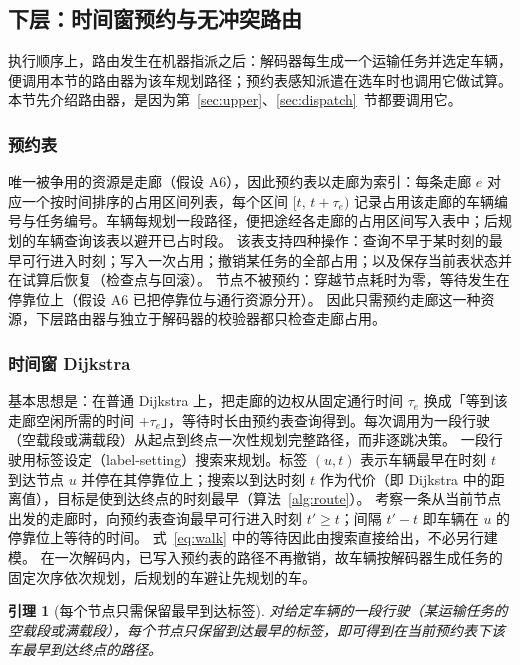 \documentclass[manuscript,screen,review]{acmart}
\newtheorem{lem}{引理}
\begin{document}
\subsection{下层：时间窗预约与无冲突路由}
\label{sec:router}

执行顺序上，路由发生在机器指派之后：解码器每生成一个运输任务并选定车辆，便调用本节的路由器为该车规划路径；预约表感知派遣在选车时也调用它做试算。本节先介绍路由器，是因为第~\ref{sec:upper}、\ref{sec:dispatch}~节都要调用它。

\subsubsection{预约表}
唯一被争用的资源是走廊（假设 A6），因此预约表以走廊为索引：每条走廊 $e$ 对应一个按时间排序的占用区间列表，每个区间 $[t,\,t+\tau_e)$ 记录占用该走廊的车辆编号与任务编号。车辆每规划一段路径，便把途经各走廊的占用区间写入表中；后规划的车辆查询该表以避开已占时段。
该表支持四种操作：查询不早于某时刻的最早可行进入时刻；写入一次占用；撤销某任务的全部占用；以及保存当前表状态并在试算后恢复（检查点与回滚）。
节点不被预约：穿越节点耗时为零，等待发生在停靠位上（假设 A6 已把停靠位与通行资源分开）。
因此只需预约走廊这一种资源，下层路由器与独立于解码器的校验器都只检查走廊占用。

\subsubsection{时间窗 Dijkstra}
基本思想是：在普通 Dijkstra 上，把走廊的边权从固定通行时间 $\tau_e$ 换成「等到该走廊空闲所需的时间 $+\tau_e$」，等待时长由预约表查询得到。每次调用为一段行驶（空载段或满载段）从起点到终点一次性规划完整路径，而非逐跳决策。
一段行驶用标签设定（label-setting）搜索来规划。标签 $(u,t)$ 表示车辆最早在时刻 $t$ 到达节点 $u$ 并停在其停靠位上；搜索以到达时刻 $t$ 作为代价（即 Dijkstra 中的距离值），目标是使到达终点的时刻最早（算法~\ref{alg:route}）。
考察一条从当前节点出发的走廊时，向预约表查询最早可行进入时刻 $t'\ge t$；间隔 $t'-t$ 即车辆在 $u$ 的停靠位上等待的时间。
式~\eqref{eq:walk} 中的等待因此由搜索直接给出，不必另行建模。
在一次解码内，已写入预约表的路径不再撤销，故车辆按解码器生成任务的固定次序依次规划，后规划的车避让先规划的车。

\begin{lem}[每个节点只需保留最早到达标签]
\label{lem:label}
对给定车辆的一段行驶（某运输任务的空载段或满载段），每个节点只保留到达最早的标签，即可得到在当前预约表下该车最早到达终点的路径。
\end{lem}
\end{document}
